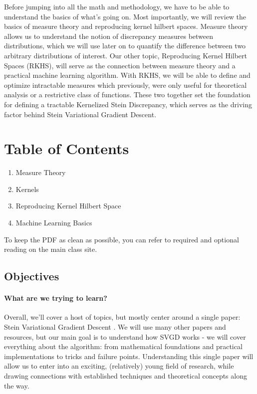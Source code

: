 \documentclass[12pt]{article}
\begin{document}
    \MakeScribeTop


Before jumping into all the math and methodology, we have to be able to  understand the basics of what’s going on. Most importantly, we will review the basics of measure theory and reproducing kernel hilbert spaces. Measure theory allows us to understand the notion of discrepancy measures between distributions, which we will use later on to quantify the difference between two arbitrary distributions of interest. Our other topic, Reproducing Kernel Hilbert Spaces (RKHS), will serve as the connection between measure theory and a practical machine learning algorithm. With RKHS, we will be able to define and optimize intractable measures which previously, were only useful for theoretical analysis or a restrictive class of functions. These two together set the foundation for defining a tractable Kernelized Stein Discrepancy, which serves as the driving factor behind Stein Variational Gradient Descent. 

\section{Table of Contents}

\begin{enumerate}
    \item Measure Theory
    \item Kernels
    \item Reproducing Kernel Hilbert Space
    \item Machine Learning Basics 

\end{enumerate}

To keep the PDF as clean as possible, you can refer to required and optional reading on the main class site.

\subsection{Objectives}

\paragraph{What are we trying to learn?} Overall, we'll cover a host of topics, but mostly center around a single paper: Stein Variational Gradient Descent \cite{liu2016stein}. We will use many other papers and resources, but our main goal is to understand how SVGD works - we will cover everything about the algorithm: from mathematical foundations and practical implementations to tricks and failure points. Understanding this single paper will allow us to enter into an exciting, (relatively) young field of research, while drawing connections with established techniques and theoretical concepts along the way. 
\end{document}
